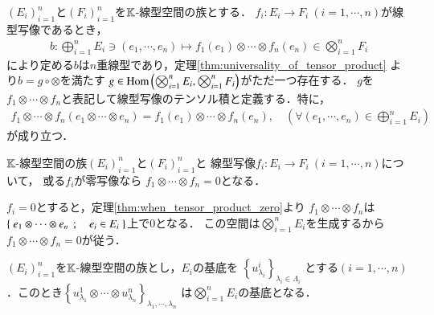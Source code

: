 	\begin{screen}
		\begin{dfn}[線型写像のテンソル積]
				$(E_i)_{i=1}^n$と$(F_i)_{i=1}^n$を$\mathbb{K}$-線型空間の族とする．
				$f_i:E_i \longrightarrow F_i\ (i=1,\cdots,n)$が線型写像であるとき，
				\begin{align}
					b: \bigoplus_{i=1}^n E_i \ni (e_1,\cdots,e_n)
					\longmapsto f_1(e_1)\otimes \cdots \otimes f_n(e_n)
					\in \bigotimes_{i=1}^n F_i
				\end{align}
				により定める$b$は$n$重線型であり，定理\ref{thm:universality_of_tensor_product}
				より$b = g \circ \otimes$を満たす
				$g \in \mathrm{Hom} \left(\bigotimes_{i=1}^{n} E_i,\bigotimes_{i=1}^{n} F_i\right)$がただ一つ存在する．
				$g$を$f_1 \otimes \cdots \otimes f_n$と表記して線型写像のテンソル積と定義する．特に，
				\begin{align}
					f_1 \otimes \cdots \otimes f_n(e_1 \otimes \cdots \otimes e_n)
					= f_1(e_1)\otimes \cdots \otimes f_n(e_n),
					\quad (\forall (e_1,\cdots,e_n) \in \bigoplus_{i=1}^n E_i)
				\end{align}
				が成り立つ．
		\end{dfn}
	\end{screen}
	
	\begin{screen}
		\begin{thm}[零写像のテンソル積は零写像]
		\label{thm:tensor_product_contains_zero_mapping_is_zero}
			$\mathbb{K}$-線型空間の族$(E_i)_{i=1}^n$と$(F_i)_{i=1}^n$と
			線型写像$f_i:E_i \longrightarrow F_i\ (i=1,\cdots,n)$について，
			或る$f_i$が零写像なら
			$f_1 \otimes \cdots \otimes f_n = 0$となる．
		\end{thm}
	\end{screen}
	
	\begin{prf}
		$f_i = 0$とすると，定理\ref{thm:when_tensor_product_zero}より
		$f_1 \otimes \cdots \otimes f_n$は
		$\left\{\ e_1 \otimes \cdots \otimes e_n\ \, ; \quad e_i \in E_i\ \right\}$上で0となる．
		この空間は$\bigotimes_{i=1}^{n} E_i$を生成するから
		$f_1 \otimes \cdots \otimes f_n = 0$が従う．
		\QED
	\end{prf}
	
	\begin{screen}
		\begin{thm}[テンソル積の基底]
			$(E_i)_{i=1}^n$を$\mathbb{K}$-線型空間の族とし，$E_i$の基底を
			$\left\{ u^i_{\lambda_i} \right\}_{\lambda_i \in \Lambda_i}$
			とする$(i=1,\cdots,n)$．このとき$\left\{ u^1_{\lambda_1} \otimes 
			\cdots \otimes u^n_{\lambda_n} \right\}_{\lambda_1,\cdots,\lambda_n}$
			は$\bigotimes_{i=1}^n E_i$の基底となる．
		\end{thm}
	\end{screen}
	
